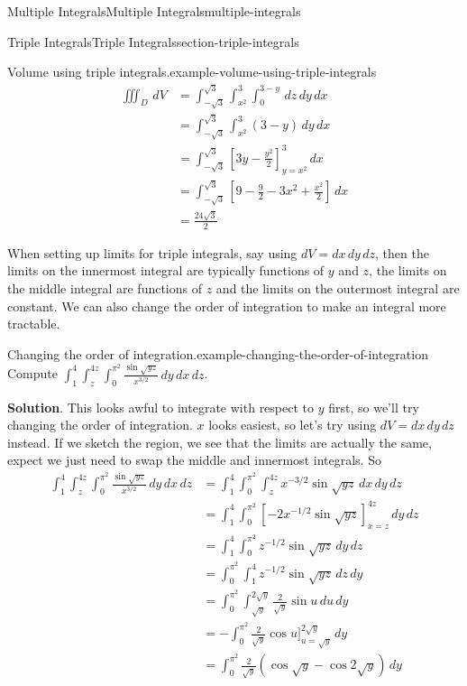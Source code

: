 \documentclass[oneside,10pt,]{book}
\numberwithin{equation}{section}
\begin{document}
\begin{chapterptx}{Multiple Integrals}{}{Multiple Integrals}{}{}{multiple-integrals}
\begin{sectionptx}{Triple Integrals}{}{Triple Integrals}{}{}{section-triple-integrals}
\begin{example}{Volume using triple integrals.}{example-volume-using-triple-integrals}
\begin{align*}
\iiint_{D}\,dV & = \int_{-\sqrt{3}}^{\sqrt{3}}\int_{x^{2}}^{3}\int_{0}^{3-y}\,dz\,dy\,dx \\
& = \int_{-\sqrt{3}}^{\sqrt{3}}\int_{x^{2}}^{3} (3-y)\,dy\,dx \\
& = \int_{-\sqrt{3}}^{\sqrt{3}}\left[3y-\frac{y^{2}}{2}\right]_{y=x^{2}}^{3}\,dx \\
& = \int_{-\sqrt{3}}^{\sqrt{3}}\left[9 - \frac{9}{2} - 3x^{2} + \frac{x^{2}}{2}\right]\,dx \\
& = \frac{24\sqrt{3}}{2} 
\end{align*}
%
\end{example}
\hypertarget{p-1520}{}%
When setting up limits for triple integrals, say using \(dV = dx\,dy\,dz\), then the limits on the innermost integral are typically functions of \(y\) and \(z\), the limits on the middle integral are functions of \(z\) and the limits on the outermost integral are constant. We can also change the order of integration to make an integral more tractable.%
\begin{example}{Changing the order of integration.}{example-changing-the-order-of-integration}%
\hypertarget{p-1521}{}%
Compute \(\int_{1}^{4}\int_{z}^{4z}\int_{0}^{\pi^{2}}\frac{\sin\sqrt{yz}}{x^{3/2}}\,dy\,dx\,dz\).%
\par\smallskip%
\noindent\textbf{Solution}.\hypertarget{solution-251}{}\quad%
\hypertarget{p-1522}{}%
This looks awful to integrate with respect to \(y\) first, so we'll try changing the order of integration. \(x\) looks easiest, so let's try using \(dV = dx\,dy\,dz\) instead. If we sketch the region, we see that the limits are actually the same, expect we just need to swap the middle and innermost integrals. So%
\begin{align*}
\int_{1}^{4}\int_{z}^{4z}\int_{0}^{\pi^{2}}\frac{\sin\sqrt{yz}}{x^{3/2}}\,dy\,dx\,dz  & = \int_{1}^{4}\int_{0}^{\pi^{2}}\int_{z}^{4z}x^{-3/2}\sin\sqrt{yz}\,dx\,dy\,dz \\
& = \int_{1}^{4}\int_{0}^{\pi^{2}}\left[-2x^{-1/2}\sin\sqrt{yz}\right]_{x=z}^{4z}\,dy\,dz \\
& = \int_{1}^{4}\int_{0}^{\pi^{2}}z^{-1/2}\sin\sqrt{yz}\,dy\,dz \\
& = \int_{0}^{\pi^{2}}\int_{1}^{4}z^{-1/2}\sin\sqrt{yz}\,dz\,dy \\
& = \int_{0}^{\pi^{2}}\int_{\sqrt{y}}^{2\sqrt{y}}\frac{2}{\sqrt{y}}\sin u\,du\,dy \\
& = -\int_{0}^{\pi^{2}}\frac{2}{\sqrt{y}}\cos u\bigg]_{u=\sqrt{y}}^{2\sqrt{y}}\,dy \\
& = \int_{0}^{\pi^{2}}\frac{2}{\sqrt{y}}(\cos\sqrt{y} - \cos2\sqrt{y})\,dy \\

\end{align*}
\end{example}
\end{sectionptx}
\end{chapterptx}
\end{document}
